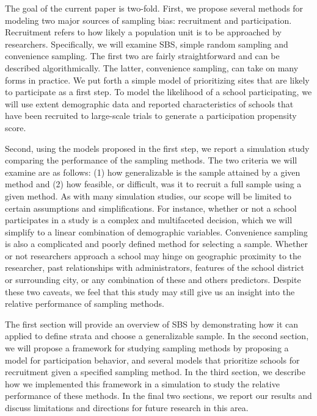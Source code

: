 \documentclass[man,floatsintext]{apa6}
\begin{document}
The goal of the current paper is two-fold. First, we propose several methods for modeling two major sources of sampling bias: recruitment and participation. Recruitment refers to how likely a population unit is to be approached by researchers. Specifically, we will examine SBS, simple random sampling and convenience sampling. The first two are fairly straightforward and can be described algorithmically. The latter, convenience sampling, can take on many forms in practice. We put forth a simple model of prioritizing sites that are likely to participate as a first step. To model the likelihood of a school participating, we will use extent demographic data and reported characteristics of schools that have been recruited to large-scale trials to generate a participation propensity score.

Second, using the models proposed in the first step, we report a simulation study comparing the performance of the sampling methods. The two criteria we will examine are as follows: (1) how generalizable is the sample attained by a given method and (2) how feasible, or difficult, was it to recruit a full sample using a given method. As with many simulation studies, our scope will be limited to certain assumptions and simplifications. For instance, whether or not a school participates in a study is a complex and multifaceted decision, which we will simplify to a linear combination of demographic variables. Convenience sampling is also a complicated and poorly defined method for selecting a sample. Whether or not researchers approach a school may hinge on geographic proximity to the researcher, past relationships with administrators, features of the school district or surrounding city, or any combination of these and others predictors. Despite these two caveats, we feel that this study may still give us an insight into the relative performance of sampling methods.

The first section will provide an overview of SBS by demonstrating how it can applied to define strata and choose a generalizable sample. In the second section, we will propose a framework for studying sampling methods by proposing a model for participation behavior, and several models that prioritize schools for recruitment given a specified sampling method. In the third section, we describe how we implemented this framework in a simulation to study the relative performance of these methods. In the final two sections, we report our results and discuss limitations and directions for future research in this area.
\end{document}
